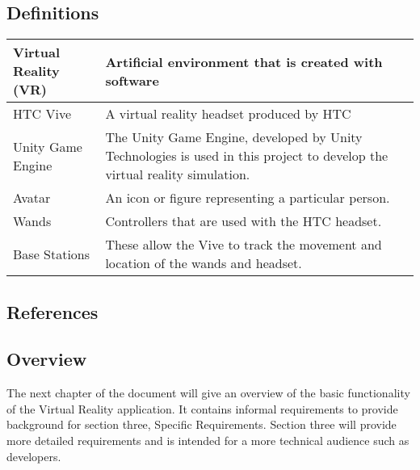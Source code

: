 \documentclass[10pt,journal,compsoc,onecolumn, draftclsnofoot]{IEEEtran}
\begin{document}
\begin{bibunit}
\subsection{Definitions}
\begin{center}
	\begin{tabular}{| m{3cm} | m{9cm} |}
		\hline
		Virtual Reality (VR) & Artificial environment that is created with software \\
		\hline
		HTC Vive & A virtual reality headset produced by HTC \\
		\hline
		Unity Game Engine & The Unity Game Engine, developed by Unity
		Technologies is used in this project to develop the virtual reality simulation. \\
    	\hline
    	Avatar & An icon or figure representing a particular person. \\
    	\hline
    	Wands & Controllers that are used with the HTC headset. \\
    	\hline
		Base Stations & These allow the Vive to track the movement and location of
    the wands and headset. \\
		\hline
	\end{tabular}
\end{center}

\subsection{References}
\begingroup
\renewcommand{\addcontentsline}[3]{}%
\renewcommand{\section}[2]{}%
% 
% 
\putbib[requirementsdoc]
\endgroup

\subsection{Overview}
The next chapter of the document will give an overview of the basic functionality
of the Virtual Reality application. It contains informal requirements to provide
background for section three, Specific Requirements. Section three
will provide more detailed requirements and is intended for a more
technical audience such as developers.


\end{bibunit}
\end{document}
